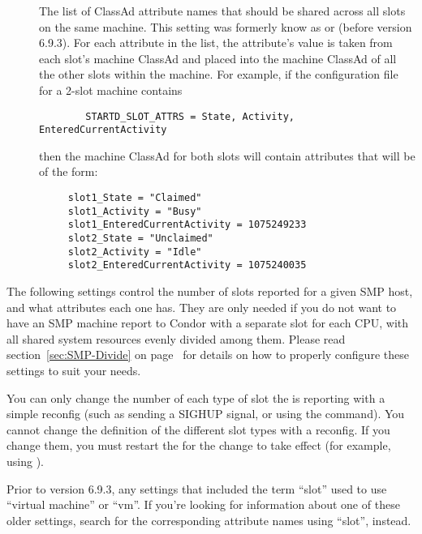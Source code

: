 \begin{description}
\item[]
\label{param:StartdSlotAttrs}
  The list of ClassAd attribute names that should be shared across all
  slots on the same machine.
  This setting was formerly know as  or
   (before version 6.9.3).
  For each attribute in the list, the attribute's value is taken from
  each slot's machine ClassAd and placed into the machine
  ClassAd of all the other slots within the machine.
  For example, if the configuration file for a 2-slot machine
  contains
\begin{verbatim}
        STARTD_SLOT_ATTRS = State, Activity, EnteredCurrentActivity
\end{verbatim}
  then the machine ClassAd for both slots will contain
  attributes that will be of the form:
\begin{verbatim}
     slot1_State = "Claimed"
     slot1_Activity = "Busy"
     slot1_EnteredCurrentActivity = 1075249233
     slot2_State = "Unclaimed"
     slot2_Activity = "Idle"
     slot2_EnteredCurrentActivity = 1075240035
\end{verbatim}


\end{description}

The following settings control the number of slots reported
for a given SMP host, and what attributes each one has.  
They are only needed if you do not want to have an SMP machine report
to Condor with a separate slot for each CPU, with all
shared system resources evenly divided among them.
Please read section~\ref{sec:SMP-Divide} on
page~\pageref{sec:SMP-Divide} for details on how to properly configure
these settings to suit your needs.

\Note You can only change the number of each type of slot
the  is reporting with a simple reconfig (such as
sending a SIGHUP signal, or using the  command).
You cannot change the definition of the different slot
types with a reconfig.  
If you change them, you must restart the  for the
change to take effect (for example, using 
).

\Note Prior to version 6.9.3, any settings that included the term
``slot'' used to use ``virtual machine'' or ``vm''.
If you're looking for information about one of these older settings,
search for the corresponding attribute names using ``slot'', instead.

